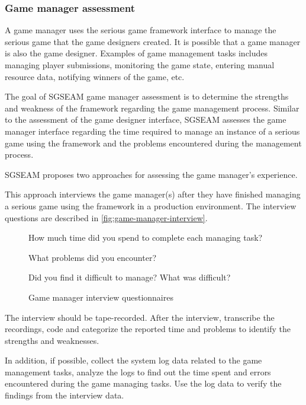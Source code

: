 \subsubsection{Game manager assessment}

A game manager uses the serious game framework interface to manage the serious game that the game
designers created. It is possible that a game manager is also the game designer.
Examples of game management tasks includes managing player submissions, monitoring the game 
state, entering manual resource data, notifying winners of the game, etc.

The goal of SGSEAM game manager assessment is to determine the strengths and weakness of the framework 
regarding the game management process. Similar to the assessment of the game designer interface, SGSEAM assesses 
the game manager interface regarding the time required to manage an instance of a serious game using the framework
and the problems encountered during the management process.

SGSEAM proposes two approaches for assessing the game manager's experience.

\label{Post-hoc game manager interview}

This approach interviews the game manager(s) after they have finished managing a serious game using the framework 
in a production environment. The interview questions are described in \autoref{fig:game-manager-interview}.
 
\begin{figure}[ht!]
\begin{mybox}
\begin{compactenum}
\item How much time did you spend to complete each managing task?
\item What problems did you encounter?
\item Did you find it difficult to manage? What was difficult?
\end{compactenum}
\end{mybox}
\caption{Game manager interview questionnaires}
\label{fig:game-manager-interview}  
\end{figure}

The interview should be tape-recorded. After the interview, transcribe the recordings, code and categorize the reported 
time and problems to identify the strengths and weaknesses.

In addition, if possible, collect the system log data related to the game management tasks, analyze the logs to find out the time 
spent and errors encountered during the game managing tasks. Use the log data to verify the findings from the interview data.

